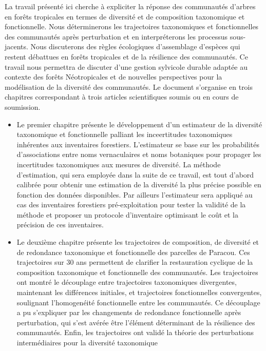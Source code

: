 \documentclass[
  11pt,
  french,
  A4paper,
  extrafontsizes,onecolumn,openright
  ]{memoir}
\begin{document}
La travail présenté ici cherche à expliciter la réponse des communautés
d'arbres en forêts tropicales en termes de diversité et de composition
taxonomique et fonctionnelle. Nous déterminerons les trajectoires
taxonomiques et fonctionnelles des communautés après perturbation et en
interpréterons les processus sous-jacents. Nous discuterons des règles
écologiques d'assemblage d'espèces qui restent débattues en forêts
tropicales et de la résilience des communautés. Ce travail nous
permettra de discuter d'une gestion sylvicole durable adaptée au
contexte des forêts Néotropicales et de nouvelles perspectives pour la
modélisation de la diversité des communautés. Le document s'organise en
trois chapitres correspondant à trois articles scientifiques soumis ou
en cours de soumission.

\begin{itemize}
\item
  Le premier chapitre présente le développement d'un estimateur de la
  diversité taxonomique et fonctionnelle palliant les inceertitudes
  taxonomiques inhérentes aux inventaires forestiers. L'estimateur se
  base sur les probabilités d'associations entre noms vernaculaires et
  noms botaniques pour propager les incertitudes taxonomiques aux
  mesures de diversité. La méthode d'estimation, qui sera employée dans
  la suite de ce travail, est tout d'abord calibrée pour obtenir une
  estimation de la diversité la plus précise possible en fonction des
  données disponibles. Par ailleurs l'estimateur sera appliqué au cas
  des inventaires forestiers pré-exploitation pour tester la validité de
  la méthode et proposer un protocole d'inventaire optimisant le coût et
  la précision de ces inventaires.
\item
  Le deuxième chapitre présente les trajectoires de composition, de
  diversité et de redondance taxonomique et fonctionnelle des parcelles
  de Paracou. Ces trajectoires sur 30 ans permettent de clarifier la
  restauration cyclique de la composition taxonomique et fonctionnelle
  des communautés. Les trajectoires ont montré le découplage entre
  trajectoires taxonomiques divergentes, maintenant les différences
  initiales, et trajectoires fonctionnelles convergentes, soulignant
  l'homogenéité fonctionnelle entre les communautés. Ce découplage a pu
  s'expliquer par les changements de redondance fonctionnelle après
  perturbation, qui s'est avérée être l'élément déterminant de la
  résilience des communautés. Enfin, les trajectoires ont validé la
  théorie des perturbations intermédiaires pour la diversité taxonomique

\end{itemize}
\end{document}
